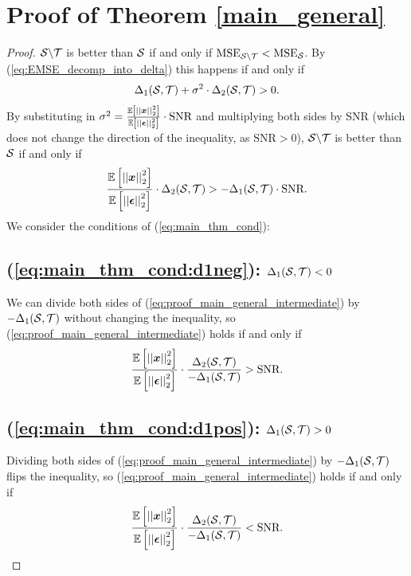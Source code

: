 {\color{black}
\section{Proof of Theorem \ref{main_general}}
\label{app:main_thm_proof}
\begin{proof}
    
$\mathcal{S} \backslash \mathcal{T}$ is better than $\mathcal{S}$ if and only if $\textrm{MSE}_{\mathcal{S}\backslash\mathcal{T}} < \textrm{MSE}_{
\mathcal{S}}$. By (\ref{eq:EMSE_decomp_into_delta}) this happens if and only if
\begin{equation}
    \Delta_{1}(\mathcal{S},\mathcal{T}) + \sigma^{2} \cdot \Delta_{2}(\mathcal{S},\mathcal{T}) > 0.
\end{equation}
By substituting in $\sigma^{2} = {\color{black} \frac{\expect{\sqnormvec{\vect{x}}}}{\expect{\sqnormvec{\vect{\epsilon}}}} }  \cdot \textrm{SNR}$ and multiplying both sides by SNR (which does not change the direction of the inequality, as $\textrm{SNR} > 0$), $\mathcal{S} \backslash \mathcal{T}$ is better than $\mathcal{S}$ if and only if
\begin{equation}
\label{eq:proof_main_general_intermediate}
   {\color{black} \frac{\expect{\sqnormvec{\vect{x}}}}{\expect{\sqnormvec{\vect{\epsilon}}}} } \cdot \Delta_{2}(\set{S},\set{T}) > -\Delta_{1}(\set{S},\set{T}) \cdot \textrm{SNR}. 
\end{equation}
We consider the conditions of (\ref{eq:main_thm_cond}):
\subsection*{\texorpdfstring{(\ref{eq:main_thm_cond:d1neg}): $\Delta_{1}(\mathcal{S},\mathcal{T}) < 0$}{(\ref{eq:main_thm_cond:d1neg}): \textDelta\textoneinferior(S,T) < 0}}
We can divide both sides of (\ref{eq:proof_main_general_intermediate}) by $-\Delta_{1}(\mathcal{S},\mathcal{T})$ without changing the inequality, so (\ref{eq:proof_main_general_intermediate}) holds if and only if
\begin{equation}
  {\color{black} \frac{\expect{\sqnormvec{\vect{x}}}}{\expect{\sqnormvec{\vect{\epsilon}}}} } \cdot \frac{\Delta_{2}(\set{S},\set{T})}{-\Delta_{1}(\set{S},\set{T})} >  \textrm{SNR}.
\end{equation}

\subsection*{\texorpdfstring{(\ref{eq:main_thm_cond:d1pos}): $\Delta_{1}(\mathcal{S},\mathcal{T}) > 0$}{(\ref{eq:main_thm_cond:d1pos}): \textDelta\textoneinferior(S,T) > 0}}
Dividing both sides of (\ref{eq:proof_main_general_intermediate}) by $-\Delta_{1}(\mathcal{S},\mathcal{T})$ flips the inequality, so (\ref{eq:proof_main_general_intermediate}) holds if and only if
\begin{equation}
  {\color{black} \frac{\expect{\sqnormvec{\vect{x}}}}{\expect{\sqnormvec{\vect{\epsilon}}}} } \cdot\frac{\Delta_{2}(\set{S},\set{T})}{-\Delta_{1}(\set{S},\set{T})} < \textrm{SNR}.
\end{equation}


\end{proof}}
